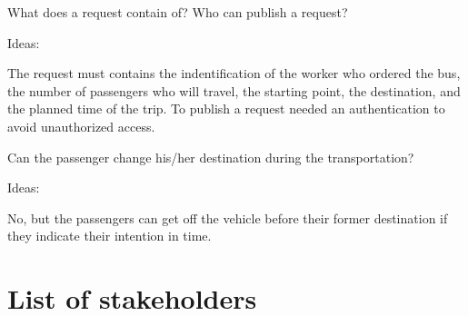 \documentclass[a4paper]{article}
\begin{document}
What does a request contain of? Who can publish a request?

Ideas:

The request must contains the indentification of the worker who ordered the bus, the number of passengers who will travel, the starting point, the destination, and the planned time of the trip. To publish a request needed an authentication to avoid unauthorized access.

Can the passenger change his/her destination during the transportation?

Ideas:

No, but the passengers can get off the vehicle before their former destination if they indicate their intention in time.


\section{List of stakeholders}

%
%
%
%
%
\end{document}
